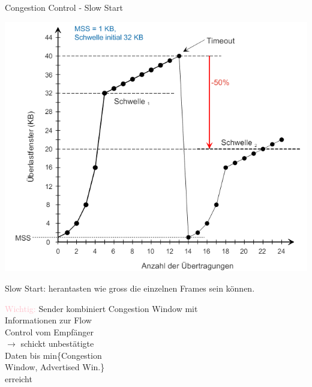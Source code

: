\begin{concept}{Congestion Control - Slow Start}\\
    \begin{minipage}{0.6\linewidth}
        \includegraphics[width=1\linewidth]{images/congestion_control.png}
    \end{minipage}
    \begin{minipage}{0.39\linewidth}
        {\small
        Slow Start: herantasten wie gross die einzelnen Frames sein können.

        \vspace{1mm}

        \textcolor{pink}{Wichtig:} Sender kombiniert Congestion Window mit\\ Informationen zur Flow\\ Control vom Empfänger\\ $\rightarrow$ schickt unbestätigte \\Daten bis min\{Congestion\\ Window, Advertised Win.\}\\ erreicht
        }
    \end{minipage}
\end{concept}



